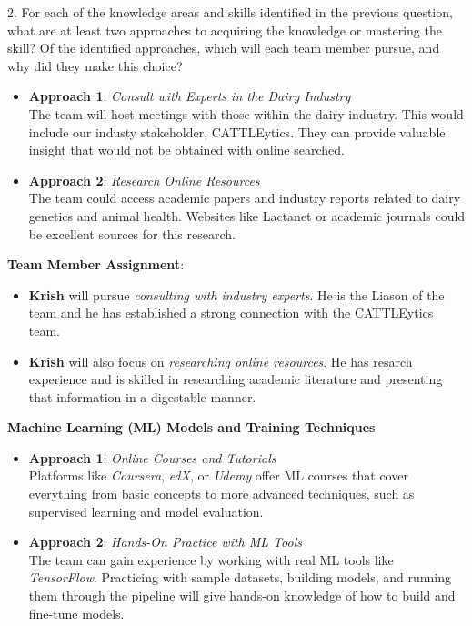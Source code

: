 \documentclass[12pt]{article}
\begin{document}
2. For each of the knowledge areas and skills identified in the previous
question, what are at least two approaches to acquiring the knowledge or
mastering the skill?  Of the identified approaches, which will each team
member pursue, and why did they make this choice? \\


\begin{itemize}
    \item \textbf{Approach 1}: \textit{Consult with Experts in the Dairy 
    Industry} \\
    The team will host meetings with those within the dairy industry. This 
    would include our industy stakeholder, CATTLEytics. They can provide 
    valuable insight that would not be obtained with online searched. 
    \item \textbf{Approach 2}: \textit{Research Online Resources} \\
    The team could access academic papers and industry reports related to dairy 
    genetics and animal health. Websites like Lactanet or academic journals 
    could be excellent sources for this research.
\end{itemize}

\textbf{Team Member Assignment}:
\begin{itemize}
    \item \textbf{Krish} will pursue \textit{consulting with industry experts}. 
    He is the Liason of the team and he has established a strong connection 
    with the CATTLEytics team.
    \item \textbf{Krish} will also focus on \textit{researching online 
    resources}. He has resarch experience and is skilled in researching 
    academic literature and presenting that information in a digestable manner.
\end{itemize}

\textbf{Machine Learning (ML) Models and Training Techniques}

\begin{itemize}
    \item \textbf{Approach 1}: \textit{Online Courses and Tutorials} \\
    Platforms like \textit{Coursera}, \textit{edX}, or \textit{Udemy} offer ML 
    courses that cover everything from basic concepts to more advanced 
    techniques, such as supervised learning and model evaluation.
    \item \textbf{Approach 2}: \textit{Hands-On Practice with ML Tools} \\
    The team can gain experience by working with real ML tools like \textit
    {TensorFlow}. Practicing with sample datasets, building models, and running 
    them through the pipeline will give hands-on knowledge of how to build and 
    fine-tune models.
\end{itemize}
\end{document}
